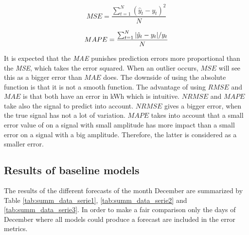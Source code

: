 \begin{equation}\label{eq:MSE}
	MSE = \frac{\sum_{t=1}^{N}(\hat{y}_t-y_t)^2}{N}
\end{equation}

\begin{equation}\label{eq:MAPE}
	MAPE = \frac{\sum_{t=1}^{N}\abs{\hat{y}_t-y_t}/y_t}{N}
\end{equation}


It is expected that the \textit{MAE} punishes prediction errors more proportional than the \textit{MSE}, which takes the error squared. When an outlier occurs, $ MSE $ will see this as a bigger error than $ MAE $ does. The downside of using the absolute function is that it is not a smooth function. The advantage of using $ RMSE $ and $ MAE $ is that both have an error in kWh which is intuitive. $ NRMSE $ and $ MAPE $ take also the signal to predict into account. $ NRMSE $ gives a bigger error, when the true signal has not a lot of variation. $ MAPE $ takes into account that a small error value of on a signal with small amplitude has more impact than a small error on a signal with a big amplitude. Therefore, the latter is considered as a smaller error.


\subsection{Results of baseline models}
The results of the different forecasts of the month December are summarized by Table \ref{tab:summ_data_serie1}, \ref{tab:summ_data_serie2} and \ref{tab:summ_data_serie3}. In order to make a fair comparison only the days of December where all models could produce a forecast are included in the error metrics. 

